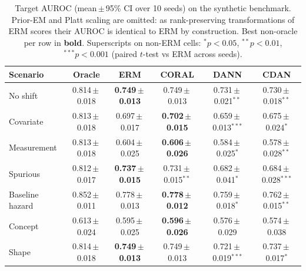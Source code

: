 \begin{table}[t]\centering\small
\setlength{\tabcolsep}{4pt}
\begin{tabular}{lccccc}
\toprule
Scenario & Oracle & ERM & CORAL & DANN & CDAN \\
\midrule
No shift & 0.814\,$\pm$\,0.018 & \textbf{0.749\,$\pm$\,0.013} & 0.749\,$\pm$\,0.013 & 0.731\,$\pm$\,0.021$^{**}$ & 0.730\,$\pm$\,0.018$^{**}$ \\
Covariate & 0.813\,$\pm$\,0.018 & 0.697\,$\pm$\,0.017 & \textbf{0.702\,$\pm$\,0.015} & 0.659\,$\pm$\,0.013$^{***}$ & 0.675\,$\pm$\,0.024$^{*}$ \\
Measurement & 0.813\,$\pm$\,0.018 & 0.604\,$\pm$\,0.025 & \textbf{0.606\,$\pm$\,0.026} & 0.584\,$\pm$\,0.025$^{*}$ & 0.578\,$\pm$\,0.028$^{**}$ \\
Spurious & 0.812\,$\pm$\,0.017 & \textbf{0.737\,$\pm$\,0.015} & 0.731\,$\pm$\,0.015$^{**}$ & 0.682\,$\pm$\,0.041$^{*}$ & 0.684\,$\pm$\,0.028$^{***}$ \\
Baseline hazard & 0.852\,$\pm$\,0.011 & 0.778\,$\pm$\,0.013 & \textbf{0.778\,$\pm$\,0.012} & 0.759\,$\pm$\,0.018$^{*}$ & 0.762\,$\pm$\,0.015$^{**}$ \\
Concept & 0.613\,$\pm$\,0.024 & 0.595\,$\pm$\,0.025 & \textbf{0.596\,$\pm$\,0.026} & 0.576\,$\pm$\,0.029 & 0.574\,$\pm$\,0.038 \\
Shape & 0.814\,$\pm$\,0.018 & \textbf{0.749\,$\pm$\,0.013} & 0.749\,$\pm$\,0.013 & 0.721\,$\pm$\,0.019$^{***}$ & 0.737\,$\pm$\,0.017$^{*}$ \\
\bottomrule
\end{tabular}
\caption{Target AUROC (mean\,$\pm$\,95\% CI over 10 seeds) on the synthetic benchmark. Prior-EM and Platt scaling are omitted: as rank-preserving transformations of ERM scores their AUROC is identical to ERM by construction. Best non-oracle per row in \textbf{bold}. Superscripts on non-ERM cells: $^{*}p{<}0.05$, $^{**}p{<}0.01$, $^{***}p{<}0.001$ (paired $t$-test vs ERM across seeds).}
\label{tab:auroc}
\end{table}
